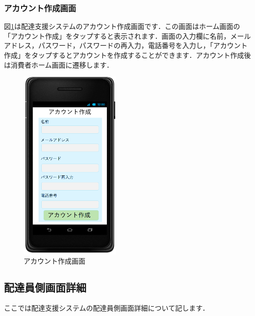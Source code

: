 \documentclass[a4j,titlepage]{jarticle}
\begin{document}
\subsubsection{アカウント作成画面}
図\ref{fig:account_create}は配達支援システムのアカウント作成画面です．この画面はホーム画面の「アカウント作成」をタップすると表示されます．画面の入力欄に名前，メールアドレス，パスワード，パスワードの再入力，電話番号を入力し，「アカウント作成」をタップするとアカウントを作成することができます．アカウント作成後は消費者ホーム画面に遷移します．

\begin{figure}[H]
 \begin{center}
  \includegraphics[width=50mm]{account_create.png}
	\caption{アカウント作成画面}
	\label{fig:account_create}
 \end{center}

\end{figure}

\subsection{配達員側画面詳細}
ここでは配達支援システムの配達員側画面詳細について記します．
\end{document}
